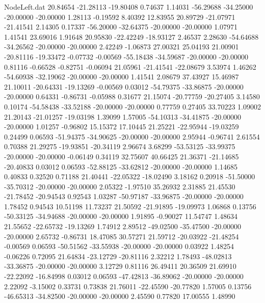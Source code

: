 \begin{filecontents}{NodeLeft.dat}
  20.84654  -21.28113  -19.80408     0.74637    1.14031  -56.29688  -34.25000  -20.00000  -20.00000    1.28113   -0.19592    8.40392   12.83955
  20.89729  -21.07971  -21.41541     2.14305    0.17337  -56.20000  -32.64375  -20.00000  -20.00000    1.07971    1.41541   23.69016    1.91648
  20.95830  -22.42249  -18.93127     2.46537    2.28630  -54.64688  -34.26562  -20.00000  -20.00000    2.42249   -1.06873   27.00321   25.04193
  21.00901  -20.81116  -19.33472    -0.07732   -0.00569  -55.18438  -34.59687  -20.00000  -20.00000    0.81116   -0.66528   -0.82751   -0.06094
  21.05961  -21.41541  -22.08679     3.53974    1.46262  -54.60938  -32.19062  -20.00000  -20.00000    1.41541    2.08679   37.43927   15.46987
  21.10011  -20.64331  -19.13269    -0.00569    0.03012  -54.79375  -33.86875  -20.00000  -20.00000    0.64331   -0.86731   -0.05988    0.31677
  21.15074  -20.77759  -20.27405     3.14580    0.10174  -54.58438  -33.52188  -20.00000  -20.00000    0.77759    0.27405   33.70223    1.09002
  21.20143  -21.01257  -19.03198     1.39099    1.57005  -54.10313  -34.41875  -20.00000  -20.00000    1.01257   -0.96802   15.15372   17.10445
  21.25221  -22.95944  -19.03259     0.24499    0.06593  -51.94375  -34.90625  -20.00000  -20.00000    2.95944   -0.96741    2.61554    0.70388
  21.29275  -19.93851  -20.34119     2.96674    3.68299  -53.53125  -33.99375  -20.00000  -20.00000   -0.06149    0.34119   32.75607   40.66425
  21.36371  -21.14685  -20.40833     0.03012    0.06593  -52.88125  -33.62812  -20.00000  -20.00000    1.14685    0.40833    0.32520    0.71188
  21.40441  -22.05322  -18.02490     3.18162    0.20918  -51.50000  -35.70312  -20.00000  -20.00000    2.05322   -1.97510   35.26932    2.31885
  21.45530  -21.78452  -20.94543     0.92543    1.03287  -50.97187  -33.96875  -20.00000  -20.00000    1.78452    0.94543   10.51198   11.73237
  21.50592  -21.91895  -19.09973     1.06868    0.13756  -50.33125  -34.94688  -20.00000  -20.00000    1.91895   -0.90027   11.54747    1.48634
  21.55652  -22.65732  -19.13269     1.74912    2.89512  -49.02500  -35.47500  -20.00000  -20.00000    2.65732   -0.86731   18.47085   30.57271
  21.59712  -20.03922  -21.48254    -0.00569    0.06593  -50.51562  -33.55938  -20.00000  -20.00000    0.03922    1.48254   -0.06226    0.72095
  21.64834  -23.12729  -20.81116     2.32212    1.78493  -48.02813  -33.36875  -20.00000  -20.00000    3.12729    0.81116   26.49411   20.36509
  21.69910  -22.22092  -16.84998     0.03012    0.06593  -47.42813  -36.89062  -20.00000  -20.00000    2.22092   -3.15002    0.33731    0.73838
  21.76011  -22.45590  -20.77820     1.57005    0.13756  -46.65313  -34.82500  -20.00000  -20.00000    2.45590    0.77820   17.00555    1.48990

\end{filecontents}
